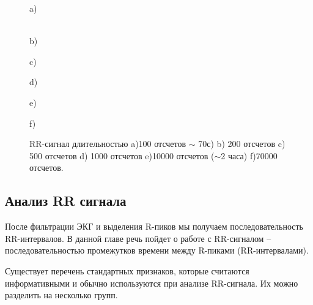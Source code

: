 \begin{figure}[h!]
	\begin{minipage}[h]{0.47\linewidth}
		\center{\texttt{[image: rr\_100]}} a) \\
	\end{minipage}
	\hfill
	\begin{minipage}[h]{0.47\linewidth}
		\center{\texttt{[image: rr\_200]}} \\b)
	\end{minipage}
	\vfill
	\begin{minipage}[h]{0.47\linewidth}
		\center{\texttt{[image: rr\_500]}} c) \\
	\end{minipage}
	\hfill
	\begin{minipage}[h]{0.47\linewidth}
		\center{\texttt{[image: rr\_1000]}} d) \\
	\end{minipage}
	\begin{minipage}[h]{0.47\linewidth}
		\center{\texttt{[image: rr\_10000]}} e) \\
	\end{minipage}
	\hfill
	\begin{minipage}[h]{0.47\linewidth}
		\center{\texttt{[image: rr\_70000]}} f) \\
	\end{minipage}
	\caption{RR-сигнал длительностью a)100 отсчетов $\sim$ 70с) b) 200 отсчетов
		c) 500 отсчетов d) 1000 отсчетов e)10000 отсчетов ($\sim $2 часа) f)70000 отсчетов.}
	\label{ris:real_RR}
\end{figure}


\subsection{Анализ RR сигнала}
После фильтрации ЭКГ и выделения R-пиков мы получаем последовательность RR-интервалов. В данной главе речь пойдет о работе с RR-сигналом -- последовательностью промежутков времени между R-пиками (RR-интервалами).

Существует перечень стандартных признаков, которые считаются информативными и обычно используются при анализе RR-сигнала.
Их можно разделить на несколько групп.


